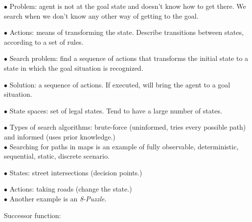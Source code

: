 \documentclass[english,openany]{book}
\begin{document}
    $\bullet$ Problem: agent is not at the goal state and doesn't know how to get there. We search when we don't know any other way of getting to the goal.
    
    $\bullet$ Actions: means of transforming the state. Describe transitions between states, according to a set of rules.
    
    $\bullet$ Search problem: find a sequence of actions that transforms the initial state to a state in which the goal situation is recognized.
    
    $\bullet$ Solution: a sequence of actions. If executed, will bring the agent to a goal situation.
    
    $\bullet$ State spaces: set of legal states. Tend to have a large number of states.
    
    $\bullet$ Types of search algorithms: brute-force (uninformed, tries every possible path) and informed (uses prior knowledge.)\\

    $\bullet$ Searching for paths in maps is an example of fully observable, deterministic, sequential, static, discrete scenario.
    
    $\bullet$ States: street intersections (decision points.)
    
    $\bullet$ Actions: taking roads (change the state.)\\
    
    $\bullet$ Another example is an \textit{8-Puzzle}.
    
    Successor function:
    
    
\end{document}
